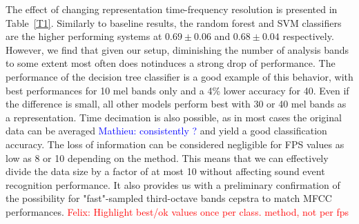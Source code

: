 \documentclass[final,3p,times,twocolumn]{elsarticle}
\newcommand{\ml}[1]{\textcolor{blue}{ Mathieu: #1}}
\newcommand{\fg}[1]{\textcolor{red}{ Felix: #1}}
\begin{document}
The effect of changing representation time-frequency resolution is presented in Table~\ref{T1}. Similarly to baseline results, the random forest and SVM classifiers are the higher performing systems at $0.69\pm 0.06$ and $0.68\pm 0.04$ respectively. However, we find that given our setup, diminishing the number of analysis bands to some extent most often does notinduces a strong drop of performance. The performance of the decision tree classifier is a good example of this behavior, with best performances for 10 mel bands only and a 4\% lower accuracy for 40. Even if the difference is small, all other models perform best with 30 or 40 mel bands as a representation. Time decimation is also possible, as in most cases the original data can be averaged \ml{consistently ?} and yield a good classification accuracy. The loss of information can be considered negligible for FPS values as low as 8 or 10 depending on the method. This means that we can effectively divide the data size by a factor of at most 10 without affecting sound event recognition performance. It also provides us with a preliminary confirmation of the possibility for "fast"-sampled third-octave bands cepstra to match  MFCC performances.\fg{Highlight best/ok values once per class. method, not per fps}\\
\end{document}
